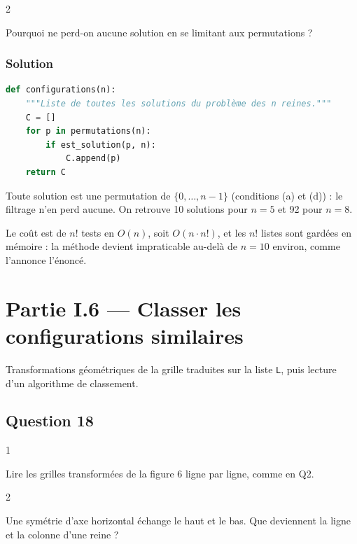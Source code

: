\documentclass[11pt,a4paper]{article}
\begin{document}
\begin{indication}{2}

Pourquoi ne perd-on aucune solution en se limitant aux permutations ?

\end{indication}

\hypertarget{solution-16}{%
\subsubsection{Solution}\label{solution-16}}

\begin{lstlisting}[language=Python]
def configurations(n):
    """Liste de toutes les solutions du problème des n reines."""
    C = []
    for p in permutations(n):
        if est_solution(p, n):
            C.append(p)
    return C
\end{lstlisting}

Toute solution est une permutation de \(\{0, \dots, n-1\}\) (conditions (a) et (d)) : le filtrage n'en perd aucune. On retrouve 10 solutions pour \(n = 5\) et 92 pour \(n = 8\).

Le coût est de \(n!\) tests en \(O(n)\), soit \(O(n \cdot n!)\), et les \(n!\) listes sont gardées en mémoire : la méthode devient impraticable au-delà de \(n = 10\) environ, comme l'annonce l'énoncé.

\hypertarget{partie-i.6-classer-les-configurations-similaires}{%
\section{Partie I.6 --- Classer les configurations similaires}\label{partie-i.6-classer-les-configurations-similaires}}

Transformations géométriques de la grille traduites sur la liste \texttt{L}, puis lecture d'un algorithme de classement.

\hypertarget{question-18}{%
\subsection{Question 18}\label{question-18}}

\begin{indication}{1}

Lire les grilles transformées de la figure 6 ligne par ligne, comme en Q2.

\end{indication}

\begin{indication}{2}

Une symétrie d'axe horizontal échange le haut et le bas. Que deviennent la ligne et la colonne d'une reine ?

\end{indication}
\end{document}
